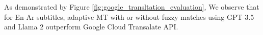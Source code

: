 \documentclass[twocolumn]{article}
\begin{document}
As demonstrated by Figure \ref{fig:google_transltation_evaluation}, We observe that for En-Ar subtitles, adaptive MT with or without fuzzy matches using GPT-3.5 and Llama 2 outperform Google Cloud Transalate API.



%
%
%
%
%
\end{document}
